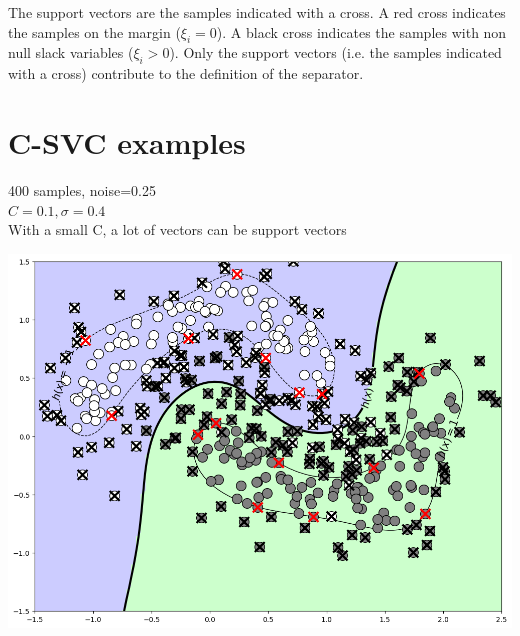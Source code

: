 \documentclass{article}
\begin{document}
\begin{multicols*}{3}
			The support vectors are the samples indicated with a cross. A red cross indicates the samples on the margin ($\xi_i =0$). A black cross indicates the samples with non null slack variables ($\xi_i > 0$). Only the support vectors (i.e. the samples indicated with a cross) contribute to the definition of the separator.
			
\section*{C-SVC examples}

\begin{minipage}{0.5\columnwidth}
	400 samples, noise=0.25\\
	$C=0.1 ,\sigma=0.4$\\
	With a small C, a lot of vectors can be support vectors
	\columnbreak
\end{minipage}
\begin{minipage}{0.4\columnwidth}
	\includegraphics[width=\columnwidth]{csvc003.png}
\end{minipage}


\end{multicols*}
\end{document}
